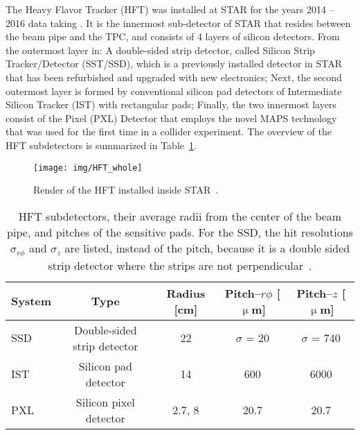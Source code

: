 The Heavy Flavor Tracker (HFT) was installed at STAR for the years 2014 -- 2016 data 
taking \cite{HftTdr, HFTLeo, HftFinal}. It is the innermost 
sub-detector of STAR that resides between the beam pipe and the TPC, and consists of 4
layers of silicon detectors. From the outermost layer in: A double-sided strip detector, called Silicon Strip
Tracker/Detector
(SST/SSD), which is a previously installed detector in STAR that has been
refurbished and upgraded with new electronics; Next, the second outermost layer is formed by conventional silicon 
pad detectors
of Intermediate Silicon Tracker (IST) 
with rectangular pads; Finally, the two innermost layers consist of the Pixel (PXL) 
Detector
that employs the novel MAPS technology that was used for the first time in a collider experiment. The overview of the 
HFT
subdetectors is summarized in Table~\ref{HFTtab}.
\begin{figure}[!htb]
\begin{center}
 \texttt{[image: img/HFT\_whole]}\\
\end{center}
\caption[Render of the HFT installed inside STAR.]{\label{HFT_whole}Render of the HFT installed inside STAR~\cite{HftTdr}\@.}
\end{figure}

\begin{table}[!htb]
\caption[HFT subdetectors.]{\label{HFTtab}HFT subdetectors, their average radii from the center of the beam pipe, and pitches of the sensitive pads. For the SSD, the hit resolutions $\sigma_{r\phi}$ and $\sigma_z$ are listed, instead of the pitch, because it is a double sided strip detector where the strips are not perpendicular~\cite{HftTdr}.}
\begin{center}
\begin{tabular}{lcccc}
\toprule
System & Type & Radius [cm] & Pitch--$r\phi$ [$\upmu$m] & Pitch--$z$ [$\upmu$m]\\
\midrule
SSD & Double-sided strip detector & 22 & $\sigma$ = 20 & $\sigma$ = 740 \\
IST & Silicon pad detector & 14 & 600 & 6000 \\
PXL & Silicon pixel detector & 2.7, 8 & 20.7 & 20.7 \\
\bottomrule
\end{tabular}
\end{center}
\end{table}



